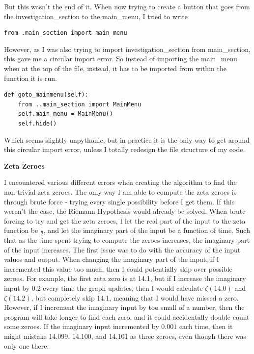 \documentclass{article}
\begin{document}
But this wasn't the end of it. When now trying to create a button that goes from the investigation\_section to the main\_menu, I tried to write

\begin{lstlisting}
from .main_section import main_menu
\end{lstlisting}

However, as I was also trying to import investigation\_section from main\_section, this gave me a circular import error. So instead of importing the main\_menu when at the top of the file, instead, it has to be imported from within the function it is run.

\begin{lstlisting}
def goto_mainmenu(self):
    from ..main_section import MainMenu
    self.main_menu = MainMenu()
    self.hide()
\end{lstlisting}

Which seems slightly unpythonic, but in practice it is the only way to get around this circular import error, unless I totally redesign the file structure of my code.


\textbf{Zeta Zeroes}

I encountered various different errors when creating the algorithm to find the non-trivial zeta zeroes. The only way I am able to compute the zeta zeroes is through brute force - trying every single possibility before I get them. If this weren't the case, the Riemann Hypothesis would already be solved. When brute forcing to try and get the zeta zeroes, I let the real part of the input to the zeta function be $\frac{1}{2}$, and let the imaginary part of the input be a function of time. Such that as the time spent trying to compute the zeroes increases, the imaginary part of the input increases. The first issue was to do with the accuracy of the input values and output. When changing the imaginary part of the input, if I incremented this value too much, then I could potentially skip over possible zeroes. For example, the first zeta zero is at 14.1, but if I increase the imaginary input by 0.2 every time the graph updates, then I would calculate $\zeta(14.0)$ and $\zeta(14.2)$, but completely skip 14.1, meaning that I would have missed a zero. However, if I increment the imaginary input by too small of a number, then the program will take longer to find each zero, and it could accidentally double count some zeroes. If the imaginary input incremented by $0.001$ each time, then it might mistake 14.099, 14.100, and 14.101 as three zeroes, even though there was only one there.
\end{document}
